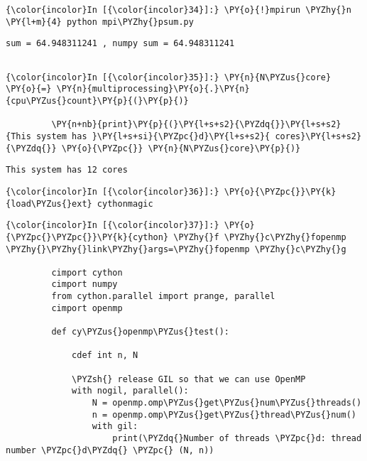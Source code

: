     \begin{Verbatim}[commandchars=\\\{\}]
{\color{incolor}In [{\color{incolor}34}]:} \PY{o}{!}mpirun \PYZhy{}n \PY{l+m}{4} python mpi\PYZhy{}psum.py
\end{Verbatim}

    \begin{Verbatim}[commandchars=\\\{\}]
sum = 64.948311241 , numpy sum = 64.948311241


    \end{Verbatim}









    \begin{Verbatim}[commandchars=\\\{\}]
{\color{incolor}In [{\color{incolor}35}]:} \PY{n}{N\PYZus{}core} \PY{o}{=} \PY{n}{multiprocessing}\PY{o}{.}\PY{n}{cpu\PYZus{}count}\PY{p}{(}\PY{p}{)}
         
         \PY{n+nb}{print}\PY{p}{(}\PY{l+s+s2}{\PYZdq{}}\PY{l+s+s2}{This system has }\PY{l+s+si}{\PYZpc{}d}\PY{l+s+s2}{ cores}\PY{l+s+s2}{\PYZdq{}} \PY{o}{\PYZpc{}} \PY{n}{N\PYZus{}core}\PY{p}{)}
\end{Verbatim}

    \begin{Verbatim}[commandchars=\\\{\}]
This system has 12 cores

    \end{Verbatim}



    \begin{Verbatim}[commandchars=\\\{\}]
{\color{incolor}In [{\color{incolor}36}]:} \PY{o}{\PYZpc{}}\PY{k}{load\PYZus{}ext} cythonmagic
\end{Verbatim}

    \begin{Verbatim}[commandchars=\\\{\}]
{\color{incolor}In [{\color{incolor}37}]:} \PY{o}{\PYZpc{}\PYZpc{}}\PY{k}{cython} \PYZhy{}f \PYZhy{}c\PYZhy{}fopenmp \PYZhy{}\PYZhy{}link\PYZhy{}args=\PYZhy{}fopenmp \PYZhy{}c\PYZhy{}g
         
         cimport cython
         cimport numpy
         from cython.parallel import prange, parallel
         cimport openmp
         
         def cy\PYZus{}openmp\PYZus{}test():
         
             cdef int n, N
         
             \PYZsh{} release GIL so that we can use OpenMP
             with nogil, parallel():
                 N = openmp.omp\PYZus{}get\PYZus{}num\PYZus{}threads()
                 n = openmp.omp\PYZus{}get\PYZus{}thread\PYZus{}num()
                 with gil:
                     print(\PYZdq{}Number of threads \PYZpc{}d: thread number \PYZpc{}d\PYZdq{} \PYZpc{} (N, n))
\end{Verbatim}

